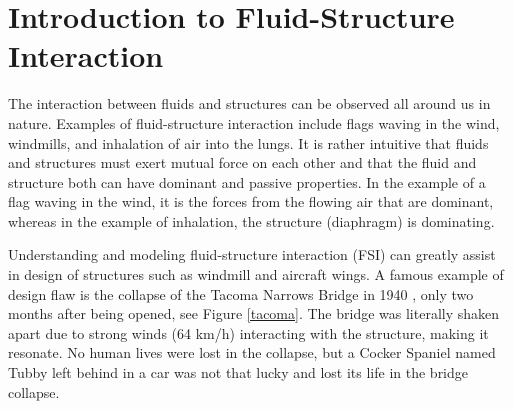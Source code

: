 \chapter{Introduction to Fluid-Structure Interaction}
The interaction between fluids and structures can be observed all around us in nature.
Examples of fluid-structure interaction include flags waving in the wind, windmills, and inhalation of air into the lungs. It is rather intuitive that fluids and structures must exert mutual force on each other and that the fluid and structure both can have dominant and passive properties. In the example of a flag waving in the wind, it is the forces from the flowing air that are dominant, whereas in the example of inhalation, the structure (diaphragm) is dominating. 

Understanding and modeling fluid-structure interaction (FSI) can greatly assist in design of structures such as windmill and aircraft wings. A famous example of design flaw is the collapse of the Tacoma Narrows Bridge in 1940 \cite{Billah1991}, only two months after being opened, see Figure \ref{tacoma}. The bridge was literally shaken apart due to strong winds (64 km/h) interacting with the structure, making it resonate. No human lives were lost in the collapse, but a Cocker Spaniel named Tubby left behind in a car was not that lucky and lost its life in the bridge collapse. \newline

